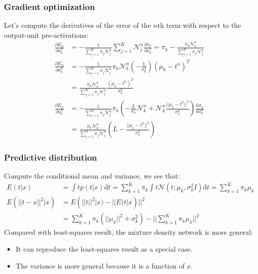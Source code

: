 \documentclass{beamer}
\begin{document}
\begin{frame}
    \frametitle{Gradient optimization}
    Let's compute the derivatives of the error of the $n$th term with respect to the output-unit pre-activations:
    \begin{align*}
        \frac{\partial{}E_{n}}{\partial{}a^{\pi}_{k}}&=-\frac{1}{\sum_{j=1}^{K}\pi_{j}\mathcal{N}^{n}_{j}}\sum_{j=1}^{K}\mathcal{N}^{n}_{j}\frac{\partial\pi_{k}}{\partial{}a^{\pi}_{k}}=\pi_{k}-\frac{\pi_{k}\mathcal{N}^{n}_{k}}{\sum_{j=1}^{K}\pi_{j}\mathcal{N}^{n}_{j}} \\
        \frac{\partial{}E_{n}}{\partial{}a^{\mu}_{k}}&=-\frac{1}{\sum_{j=1}^{K}\pi_{j}\mathcal{N}^{n}_{j}}\pi_{k}\mathcal{N}^{n}_{k}(-\frac{1}{\sigma^{2}_{k}})(\mu_{k}-t^{n})^{T} \\
        &=\frac{\pi_{k}\mathcal{N}^{n}_{k}}{\sum_{j=1}^{K}\pi_{j}\mathcal{N}^{n}_{j}}\frac{(\mu_{k}-t^{n})^{T}}{\sigma^{2}_{k}} \\
        \frac{\partial{}E_{n}}{\partial{}a^{\sigma}_{k}}&=-\frac{1}{\sum_{j=1}^{K}\pi_{j}\mathcal{N}^{n}_{j}}\pi_{k}(-\frac{L}{\sigma_{k}}\mathcal{N}^{n}_{k}+\mathcal{N}^{n}_{k}\frac{||\mu_{k}-t^{n}||^{2}}{\sigma_{k}^{3}})\frac{\mathrm{d}\sigma_{k}}{\mathrm{d}a^{\sigma}_{k}} \\
        &=\frac{\pi_{k}\mathcal{N}^{n}_{k}}{\sum_{j=1}^{K}\pi_{j}\mathcal{N}^{n}_{j}}(L-\frac{||\mu_{k}-t^{n}||^{2}}{\sigma^{2}_{k}})
    \end{align*}
\end{frame}

\begin{frame}
    \frametitle{Predictive distribution}
    Compute the conditional mean and variance, we see that:
    \begin{align*}
        E(t|x)&=\int{}tp(t|x)\mathrm{d}t=\sum_{k=1}^{K}\pi_{k}\int{t}\mathcal{N}(t;\mu_{k},\sigma^{2}_{k}I)\mathrm{d}t=\sum_{k=1}^{K}\pi_{k}\mu_{k} \\
        E(||t-x||^{2}|x)&=E(||t||^{2}|x)-||E(t|x)||^{2} \\
        &=\sum_{k=1}^{K}\pi_{k}(||\mu_{k}||^{2}+\sigma^{2}_{k})-||\sum_{k=1}^{K}\pi_{k}\mu_{k}||^{2}
    \end{align*}
    Compared with least-squares result, the mixture density network is more general:
    \begin{itemize}
        \item It can reproduce the least-squares result as a special case.
        \item The variance is more general because it is a function of $x$.
    \end{itemize}
\end{frame}
\end{document}
